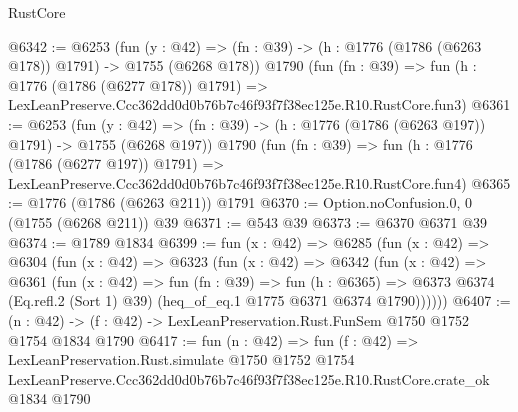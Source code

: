 \begin{lexlean}{RustCore}
\begin{coremodule}
@6342 := @6253
    (fun (y : @42) => (fn : @39) -> (h : @1776 (@1786 (@6263 @178)) @1791) -> @1755 (@6268 @178))
    @1790
    (fun (fn : @39) =>
    fun (h : @1776 (@1786 (@6277 @178)) @1791) =>
    LexLeanPreserve.Ccc362dd0d0b76b7c46f93f7f38ec125e.R10.RustCore.fun3)
@6361 := @6253
    (fun (y : @42) => (fn : @39) -> (h : @1776 (@1786 (@6263 @197)) @1791) -> @1755 (@6268 @197))
    @1790
    (fun (fn : @39) =>
    fun (h : @1776 (@1786 (@6277 @197)) @1791) =>
    LexLeanPreserve.Ccc362dd0d0b76b7c46f93f7f38ec125e.R10.RustCore.fun4)
@6365 := @1776 (@1786 (@6263 @211)) @1791
@6370 := Option.noConfusion.{0, 0} (@1755 (@6268 @211)) @39
@6371 := @543 @39
@6373 := @6370 @6371 @39
@6374 := @1789 @1834
@6399 := fun (x : @42) =>
  @6285
    (fun (x : @42) =>
    @6304
      (fun (x : @42) =>
      @6323
        (fun (x : @42) =>
        @6342
          (fun (x : @42) =>
          @6361
            (fun (x : @42) =>
            fun (fn : @39) =>
            fun (h : @6365) =>
            @6373 @6374 (Eq.refl.{2} (Sort 1) @39) (heq_of_eq.{1} @1775 @6371 @6374 @1790))))))
@6407 := (n : @42) -> (f : @42) -> LexLeanPreservation.Rust.FunSem @1750 @1752 @1754 @1834 @1790
@6417 := fun (n : @42) =>
  fun (f : @42) =>
  LexLeanPreservation.Rust.simulate
    @1750
    @1752
    @1754
    LexLeanPreserve.Ccc362dd0d0b76b7c46f93f7f38ec125e.R10.RustCore.crate_ok
    @1834
    @1790
\end{coremodule}
\end{lexlean}
